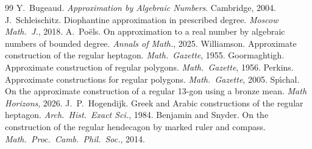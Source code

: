 \documentclass[11pt]{article}
\begin{document}
\begin{thebibliography}{99}
 Y.~Bugeaud. \textit{Approximation by Algebraic Numbers}. Cambridge, 2004.
 J.~Schleischitz. Diophantine approximation in prescribed degree. \textit{Moscow Math.\ J.}, 2018.
 A.~Po{\"e}ls. On approximation to a real number by algebraic numbers of bounded degree. \textit{Annals of Math.}, 2025.
 Williamson. Approximate construction of the regular heptagon. \textit{Math.\ Gazette}, 1955.
 Goormaghtigh. Approximate construction of regular polygons. \textit{Math.\ Gazette}, 1956.
 Perkins. Approximate constructions for regular polygons. \textit{Math.\ Gazette}, 2005.
 Sp{\'\i}chal. On the approximate construction of a regular 13-gon using a bronze mean. \textit{Math Horizons}, 2026.
 J.~P.~Hogendijk. Greek and Arabic constructions of the regular heptagon. \textit{Arch.\ Hist.\ Exact Sci.}, 1984.
 Benjamin and Snyder. On the construction of the regular hendecagon by marked ruler and compass. \textit{Math.\ Proc.\ Camb.\ Phil.\ Soc.}, 2014.

\end{thebibliography}
\end{document}

